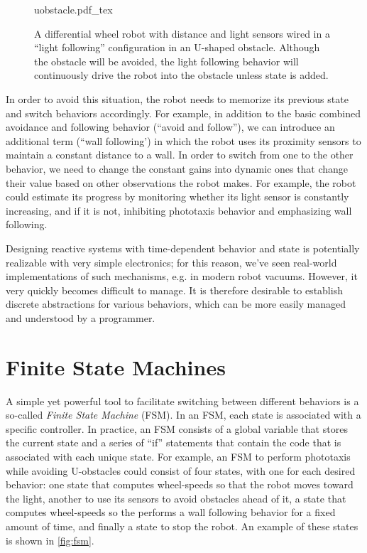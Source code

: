 \begin{figure}
\centering
    \def\svgwidth{0.64\textwidth}
    {uobstacle.pdf_tex}
    \caption{\label{fig:uobstacle}A differential wheel robot with distance and light sensors wired in a ``light following'' configuration in an U-shaped obstacle. Although the obstacle will be avoided, the light following behavior will continuously drive the robot into the obstacle unless state is added.}
\end{figure}

In order to avoid this situation, the robot needs to memorize its previous state and switch behaviors accordingly. For example, in addition to the basic combined avoidance and following behavior (``avoid and follow''), we can introduce an additional term (``wall following') in which the robot uses its proximity sensors to maintain a constant distance to a wall. In order to switch from one to the other behavior, we need to change the constant gains into dynamic ones that change their value based on other observations the robot makes. For example, the robot could estimate its progress by monitoring whether its light sensor is constantly increasing, and if it is not, inhibiting phototaxis behavior and emphasizing wall following.

Designing reactive systems with time-dependent behavior and state is potentially realizable with very simple electronics; for this reason, we've seen real-world implementations of such mechanisms, e.g. in modern robot vacuums.
However, it very quickly becomes difficult to manage. It is therefore desirable to establish discrete abstractions for various behaviors, which can be more easily managed and understood by a programmer.

\section{Finite State Machines}\label{sec:fsm}

A simple yet powerful tool to facilitate switching between different behaviors is a so-called \textsl{Finite State Machine} (FSM). In an FSM, each state is associated with a specific controller. In practice, an FSM consists of a global variable that stores the current state and a series of ``if'' statements that contain the code that is associated with each unique state. For example, an FSM to perform phototaxis while avoiding U-obstacles could consist of four states, with one for each desired behavior: one state that computes wheel-speeds so that the robot moves toward the light, another to use its sensors to avoid obstacles ahead of it, a state that computes wheel-speeds so the performs a wall following behavior for a fixed amount of time, and finally a state to stop the robot. An example of these states is shown in \cref{fig:fsm}.

